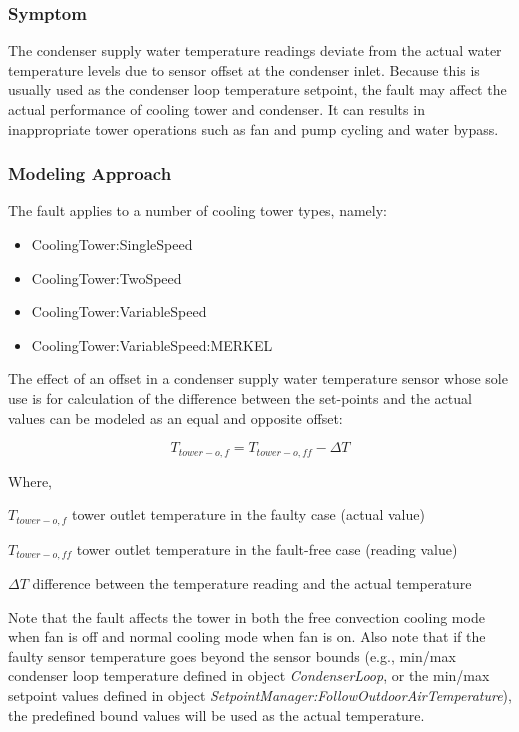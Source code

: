 \subsubsection{Symptom}

The condenser supply water temperature readings deviate from the actual water temperature levels due to sensor offset at the condenser inlet. Because this is usually used as the condenser loop temperature setpoint, the fault may affect the actual performance of cooling tower and condenser. It can results in inappropriate tower operations such as fan and pump cycling and water bypass. 

\subsubsection{Modeling Approach}

The fault applies to a number of cooling tower types, namely:

\begin{itemize}
\tightlist
\item
  CoolingTower:SingleSpeed
\item
  CoolingTower:TwoSpeed
\item
  CoolingTower:VariableSpeed
\item
  CoolingTower:VariableSpeed:MERKEL
\end{itemize}

The effect of an offset in a condenser supply water temperature sensor whose sole use is for calculation of the difference between the set-points and the actual values can be modeled as an equal and opposite offset: 

\begin{equation}
T_{tower-o,f} = T_{tower-o,ff} - \Delta T
\end{equation}

Where,

\(T_{tower-o,f}\) tower outlet temperature in the faulty case (actual value)

\(T_{tower-o,ff}\) tower outlet temperature in the fault-free case (reading value)

\(\Delta T\) difference between the temperature reading and the actual temperature

Note that the fault affects the tower in both the free convection cooling mode when fan is off and normal cooling mode when fan is on. Also note that if the faulty sensor temperature goes beyond the sensor bounds (e.g., min/max condenser loop temperature defined in object \emph{CondenserLoop}, or the min/max setpoint values defined in object \emph{SetpointManager:FollowOutdoorAirTemperature}), the predefined bound values will be used as the actual temperature.


